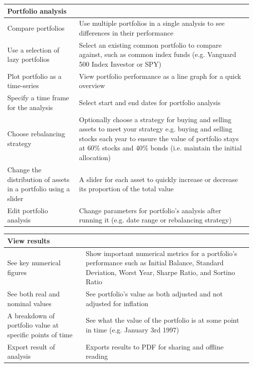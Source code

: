 \documentclass[main.tex]{subfiles}
\begin{document}
{
\setlength{\tabcolsep}{30pt}
\renewcommand{\arraystretch}{2}
\centering
{}
\begin{tabularx}{\linewidth}{|X|X|}
\hline
 \textbf{Portfolio analysis}  &  \\
 \hline
 Compare portfolios & Use multiple portfolios in a single analysis to see differences in their performance \\
\hline
Use a selection of lazy portfolios & Select an existing common portfolio to compare against, such as common index funds (e.g. Vanguard 500 Index Investor or SPY) \\
\hline
Plot portfolio as a time-series & View portfolio performance as a line graph for a quick overview \\
\hline
Specify a time frame for the analysis & Select start and end dates for portfolio analysis \\
\hline
Choose rebalancing strategy & Optionally choose a strategy for buying and selling assets to meet your strategy e.g. buying and selling stocks each year to ensure the value of portfolio stays at 60\% stocks and 40\% bonds (i.e. maintain the initial allocation) \\
\hline
Change the distribution of assets in a portfolio using a slider & A slider for each asset to quickly increase or decrease its proportion of the total value \\
\hline
Edit portfolio analysis & Change parameters for portfolio's analysis after running it (e.g. date range or rebalancing strategy) \\
\hline
\end{tabularx}
}

\vspace{0.5cm}

{
\setlength{\tabcolsep}{30pt}
\renewcommand{\arraystretch}{2}
\centering
{}
\begin{tabularx}{\linewidth}{|X|X|}
\hline
 \textbf{View results}  &  \\
 \hline
 See key numerical figures & Show important numerical metrics for a portfolio's performance such as Initial Balance, Standard Deviation, Worst Year, Sharpe Ratio, and Sortino Ratio \\
\hline
See both real and nominal values & See portfolio's value as both adjusted and not adjusted for inflation \\
\hline
A breakdown of portfolio value at specific points of time & See what the value of the portfolio is at some point in time (e.g. January 3rd 1997) \\
\hline
Export result of analysis & Exports results to PDF for sharing and offline reading \\
\hline
\end{tabularx}
}
\end{document}
